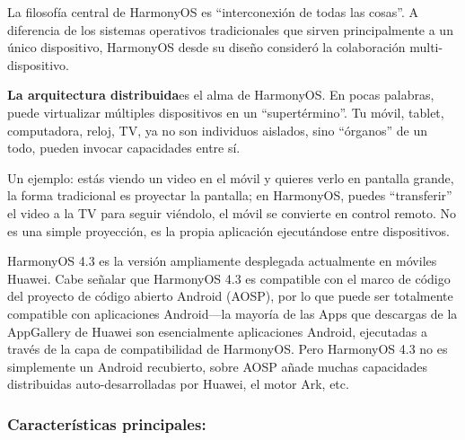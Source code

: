 


La filosofía central de HarmonyOS es “interconexión de todas las cosas”. A diferencia de los sistemas operativos tradicionales que sirven principalmente a un único dispositivo, HarmonyOS desde su diseño consideró la colaboración multi-dispositivo.

\textbf{La arquitectura distribuida}es el alma de HarmonyOS. En pocas palabras, puede virtualizar múltiples dispositivos en un “supertérmino”. Tu móvil, tablet, computadora, reloj, TV, ya no son individuos aislados, sino “órganos” de un todo, pueden invocar capacidades entre sí.

Un ejemplo: estás viendo un video en el móvil y quieres verlo en pantalla grande, la forma tradicional es proyectar la pantalla; en HarmonyOS, puedes “transferir” el video a la TV para seguir viéndolo, el móvil se convierte en control remoto. No es una simple proyección, es la propia aplicación ejecutándose entre dispositivos.


HarmonyOS 4.3 es la versión ampliamente desplegada actualmente en móviles Huawei. Cabe señalar que HarmonyOS 4.3 es compatible con el marco de código del proyecto de código abierto Android (AOSP), por lo que puede ser totalmente compatible con aplicaciones Android—la mayoría de las Apps que descargas de la AppGallery de Huawei son esencialmente aplicaciones Android, ejecutadas a través de la capa de compatibilidad de HarmonyOS. Pero HarmonyOS 4.3 no es simplemente un Android recubierto, sobre AOSP añade muchas capacidades distribuidas auto-desarrolladas por Huawei, el motor Ark, etc.

\subsubsection*{Características principales:}

